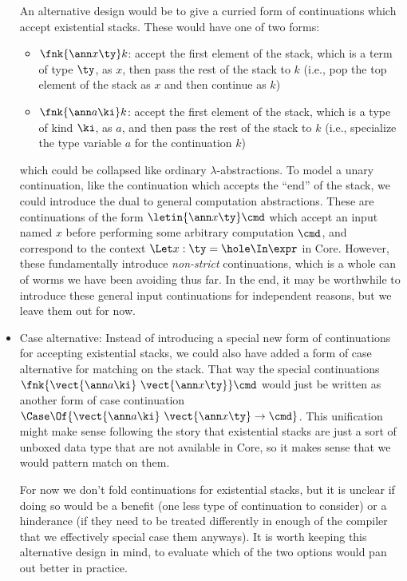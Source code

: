 \documentclass{article}
\begin{document}
\begin{itemize}
  An alternative design would be to give a curried form of continuations which
  accept existential stacks.  These would have one of two forms:
  \begin{itemize}
  \item $\fnk{\ann x \ty}k$: accept the first element of the stack, which is a
    term of type $\ty$, as $x$, then pass the rest of the stack to $k$ (i.e.,
    pop the top element of the stack as $x$ and then continue as $k$)
  \item $\fnk{\ann a \ki}k$: accept the first element of the stack, which is a
    type of kind $\ki$, as $a$, and then pass the rest of the stack to $k$
    (i.e., specialize the type variable $a$ for the continuation $k$)
  \end{itemize}
  which could be collapsed like ordinary $\lambda$-abstractions.  To model a
  unary continuation, like the continuation which accepts the ``end'' of the
  stack, we could introduce the dual to general computation abstractions.  These
  are continuations of the form $\letin{\ann x \ty}\cmd$ which accept an input
  named $x$ before performing some arbitrary computation $\cmd$, and correspond
  to the context $\Let x:\ty = \hole \In \expr$ in Core.  However, these
  fundamentally introduce \emph{non-strict} continuations, which is a whole can
  of worms we have been avoiding thus far.  In the end, it may be worthwhile to
  introduce these general input continuations for independent reasons, but we
  leave them out for now.

\item Case alternative: Instead of introducing a special new form of
  continuations for accepting existential stacks, we could also have added a
  form of case alternative for matching on the stack.  That way the special
  continuations $\fnk{\vect{\ann a \ki} ~ \vect{\ann x \ty}}\cmd$ would just be
  written as another form of case continuation
  $\Case\Of{\vect{\ann a \ki} ~ \vect{\ann x \ty} \to \cmd}$.  This unification
  might make sense following the story that existential stacks are just a sort
  of unboxed data type that are not available in Core, so it makes sense that we
  would pattern match on them.

  For now we don't fold continuations for existential stacks, but it is unclear
  if doing so would be a benefit (one less type of continuation to consider) or
  a hinderance (if they need to be treated differently in enough of the compiler
  that we effectively special case them anyways).  It is worth keeping this
  alternative design in mind, to evaluate which of the two options would pan out
  better in practice.
\end{itemize}
\end{document}
